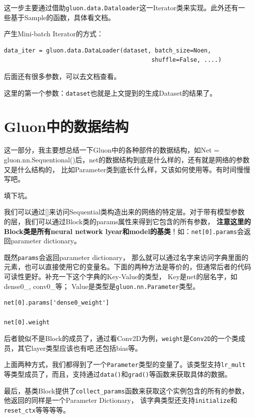 这一步主要通过借助\verb|gluon.data.Dataloader|这一Iterator类来实现。此外还有一些基于Sample的函数，具体看文档。

产生Mini-batch Iterator的方式：

\begin{verbatim}
data_iter = gluon.data.DataLoader(dataset, batch_size=Noen,  
                                          shuffle=False, ....)
\end{verbatim}

后面还有很多参数，可以去文档查看。

这里的第一个参数：\verb|dataset|也就是上文提到的生成Dataset的结果了。

\section{Gluon中的数据结构}

这一部分，我主要想总结一下Gluon中的各种部件的数据结构，如Net = gluon.nn.Sequentional()后，net的数据结构到底是什么样的，还有就是网络的参数又是什么结构的， 比如Parameter类到底长什么样，又该如何使用等。有时间慢慢写吧。

填下坑。

我们可以通过[]来访问Sequential类构造出来的网络的特定层。对于带有模型参数的层，我们可以通过Block类的params属性来得到它包含的所有参数， \textbf{注意这里的Block类是所有neural network lyear和model的基类}！如：\verb|net[0].params|会返回parameter dictionary。

既然\verb|params|会返回parameter dictionary， 那么就可以通过名字来访问字典里面的元素，也可以直接使用它的变量名。下面的两种方法是等价的，但通常后者的代码可读性更好。补充一下这个字典的Key-Value的类型， Key是net的层名字，如dense0\_, conv0\_等； Value是类型是\verb|gluon.nn.Parameter|类型。

\begin{verbatim}
net[0].params['dense0_weight']

net[0].weight
\end{verbatim}

后者貌似不是Block的成员了，通过看Conv2D为例，\verb|weight|是\verb|Conv2D|的一个类成员，其它layer类型应该也有吧,还包括bias等。

上面两种方式，我们都得到了一个\verb|Parameter|类型的变量了。该类型支持\verb|lr_mult|等类型成员了，而且，支持通过\verb|data()|和\verb|grad()|等函数来获取具体的数据。

最后，基类Block提供了\verb|collect_params|函数来获取这个实例包含的所有的参数，他返回的同样是一个Parameter Dictionary， 该字典类型还支持\verb|initialize|和\verb|reset_ctx|等等等等。

